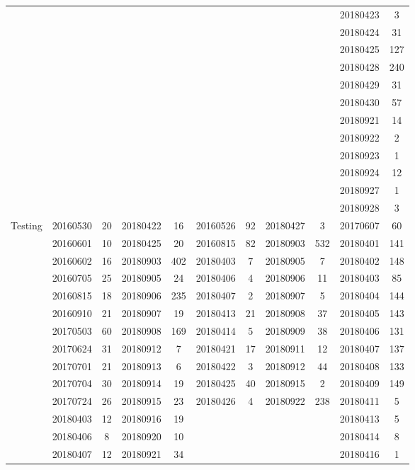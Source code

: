 \begin{table}[ht]
\begin{adjustbox}{width=\columnwidth,center}
\begin{tabular}{c|cccc|cccc|cc}
		& & & & & & & & & 20180423 & 3 \\
		& & & & & & & & & 20180424 & 31 \\
		& & & & & & & & & 20180425 & 127 \\
		& & & & & & & & & 20180428 & 240 \\
		& & & & & & & & & 20180429 & 31 \\
		& & & & & & & & & 20180430 & 57 \\
		& & & & & & & & & 20180921 & 14 \\
		& & & & & & & & & 20180922 & 2 \\
		& & & & & & & & & 20180923 & 1 \\
		& & & & & & & & & 20180924 & 12 \\
		& & & & & & & & & 20180927 & 1 \\
		& & & & & & & & & 20180928 & 3 \\ 
		\hline
		\multirow{22}{*}{ Testing } & 20160530 & 20 & 20180422 & 16 & 20160526 & 92 & 20180427 & 3 & 20170607 & 60 \\ 
		& 20160601 & 10 & 20180425 & 20 & 20160815 & 82 & 20180903 & 532 & 20180401 & 141 \\
		& 20160602 & 16 & 20180903 & 402 & 20180403 & 7 & 20180905 & 7 & 20180402 & 148 \\
		& 20160705 & 25 & 20180905 & 24 & 20180406 & 4 & 20180906 & 11 & 20180403 & 85 \\
		& 20160815 & 18 & 20180906 & 235 & 20180407 & 2 & 20180907 & 5 & 20180404 & 144 \\
		& 20160910 & 21 & 20180907 & 19 & 20180413 & 21 & 20180908 & 37 & 20180405 & 143 \\
		& 20170503 & 60 & 20180908 & 169 & 20180414 & 5 & 20180909 & 38 & 20180406 & 131 \\
		& 20170624 & 31 & 20180912 & 7 & 20180421 & 17 & 20180911 & 12 & 20180407 & 137 \\
		& 20170701 & 21 & 20180913 & 6 & 20180422 & 3 & 20180912 & 44 & 20180408 & 133 \\
		& 20170704 & 30 & 20180914 & 19 & 20180425 & 40 & 20180915 & 2 & 20180409 & 149 \\
		& 20170724 & 26 & 20180915 & 23 & 20180426 & 4 & 20180922 & 238 & 20180411 & 5 \\
		& 20180403 & 12 & 20180916 & 19 & & & & & 20180413 & 5 \\
		& 20180406 & 8 & 20180920 & 10 & & & & & 20180414 & 8 \\
		& 20180407 & 12 & 20180921 & 34 & & & & & 20180416 & 1 \\

\end{tabular}
\end{adjustbox}
\end{table}
